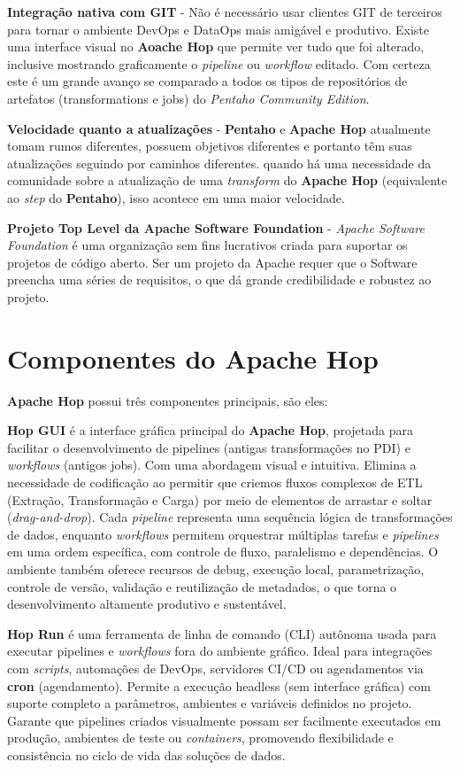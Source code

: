 \documentclass[a4paper,11pt]{article}
\begin{document}
\textbf{Integração nativa com GIT} - Não é necessário usar clientes GIT de terceiros para tornar o ambiente DevOps e DataOps mais amigável e produtivo. Existe uma interface visual no \textbf{Aoache Hop} que permite ver tudo que foi alterado, inclusive mostrando graficamente o \textit{pipeline} ou \textit{workflow} editado. Com certeza este é um grande avanço se comparado a todos os tipos de repositórios de artefatos (transformations e jobs) do \textit{Pentaho Community Edition}.

\textbf{Velocidade quanto a atualizações} - \textbf{Pentaho} e \textbf{Apache Hop} atualmente tomam rumos diferentes, possuem objetivos diferentes e portanto têm suas atualizações seguindo por caminhos diferentes. quando há uma necessidade da comunidade sobre a atualização de uma \textit{transform} do \textbf{Apache Hop} (equivalente ao \textit{step} do \textbf{Pentaho}), isso acontece em uma maior velocidade.

\textbf{Projeto Top Level da Apache Software Foundation} - \textit{Apache Software Foundation} é uma organização sem fins lucrativos criada para suportar os projetos de código aberto. Ser um projeto da Apache requer que o Software preencha uma séries de requisitos, o que dá grande credibilidade e robustez ao projeto.

\section{Componentes do Apache Hop}
\textbf{Apache Hop} possui três componentes principais, são eles:

\textbf{Hop GUI} é a interface gráfica principal do \textbf{Apache Hop}, projetada para facilitar o desenvolvimento de pipelines (antigas transformações no PDI) e \textit{workflows} (antigos jobs). Com uma abordagem visual e intuitiva. Elimina a necessidade de codificação ao permitir que criemos fluxos complexos de ETL (Extração, Transformação e Carga) por meio de elementos de arrastar e soltar (\textit{drag-and-drop}). Cada \textit{pipeline} representa uma sequência lógica de transformações de dados, enquanto \textit{workflows} permitem orquestrar múltiplas tarefas e \textit{pipelines} em uma ordem específica, com controle de fluxo, paralelismo e dependências. O ambiente também oferece recursos de debug, execução local, parametrização, controle de versão, validação e reutilização de metadados, o que torna o desenvolvimento altamente produtivo e sustentável.

\textbf{Hop Run} é uma ferramenta de linha de comando (CLI) autônoma usada para executar pipelines e \textit{workflows} fora do ambiente gráfico. Ideal para integrações com \textit{scripts}, automações de DevOps, servidores CI/CD ou agendamentos via \textbf{cron} (agendamento). Permite a execução headless (sem interface gráfica) com suporte completo a parâmetros, ambientes e variáveis definidos no projeto. Garante que pipelines criados visualmente possam ser facilmente executados em produção, ambientes de teste ou \textit{containers}, promovendo flexibilidade e consistência no ciclo de vida das soluções de dados.
\end{document}
